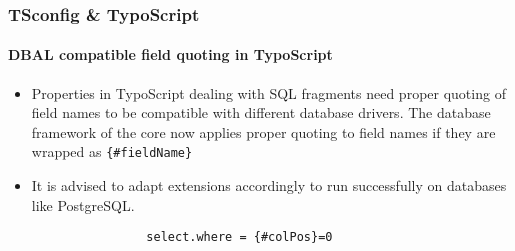 
\begin{frame}[fragile]
	\frametitle{TSconfig \& TypoScript}
	\framesubtitle{DBAL compatible field quoting in TypoScript}

	\begin{itemize}
		\item Properties in TypoScript dealing with SQL fragments need proper quoting of field names
			to be compatible with different database drivers. The database framework of the core now
			applies proper quoting to field names if they are wrapped as \texttt{\{\#fieldName\}}

		\item It is advised to adapt extensions accordingly to run successfully on databases like
			PostgreSQL.

			\begin{lstlisting}
				select.where = {#colPos}=0
			\end{lstlisting}


	\end{itemize}

\end{frame}

